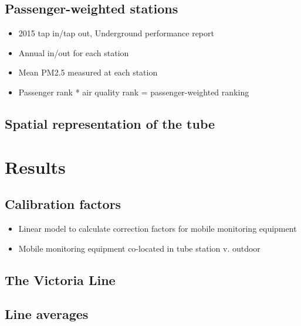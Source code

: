 \documentclass[]{article}
\providecommand{\tightlist}{%
  \setlength{\itemsep}{0pt}\setlength{\parskip}{0pt}}
\begin{document}
\hypertarget{passenger-weighted-stations}{%
\subsection{Passenger-weighted
stations}\label{passenger-weighted-stations}}

\begin{itemize}
\tightlist
\item
  2015 tap in/tap out, Underground performance report
\item
  Annual in/out for each station
\item
  Mean PM2.5 measured at each station
\item
  Passenger rank * air quality rank = passenger-weighted ranking
\end{itemize}

\hypertarget{spatial-representation-of-the-tube}{%
\subsection{Spatial representation of the
tube}\label{spatial-representation-of-the-tube}}

\hypertarget{results}{%
\section{Results}\label{results}}

\hypertarget{calibration-factors}{%
\subsection{Calibration factors}\label{calibration-factors}}

\begin{itemize}
\tightlist
\item
  Linear model to calculate correction factors for mobile monitoring
  equipment
\item
  Mobile monitoring equipment co-located in tube station v. outdoor
\end{itemize}

\hypertarget{the-victoria-line}{%
\subsection{The Victoria Line}\label{the-victoria-line}}

\hypertarget{line-averages}{%
\subsection{Line averages}\label{line-averages}}
\end{document}
